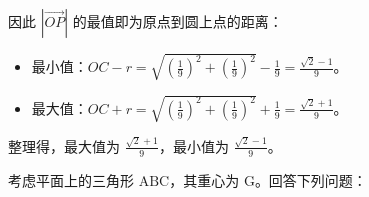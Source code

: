 \begin{questions}
\begin{parts}
\begin{solution}
        
        因此 $|\overrightarrow{OP}|$ 的最值即为原点到圆上点的距离：
        \begin{itemize}
            \item 最小值：$OC - r = \sqrt{(\frac{1}{9})^2 + (\frac{1}{9})^2} - \frac{1}{9} = \frac{\sqrt{2}-1}{9}$。
            \item 最大值：$OC + r = \sqrt{(\frac{1}{9})^2 + (\frac{1}{9})^2} + \frac{1}{9} = \frac{\sqrt{2}+1}{9}$。
        \end{itemize}
        整理得，最大值为 $\frac{\sqrt{2}+1}{9}$，最小值为 $\frac{\sqrt{2}-1}{9}$。
    \end{solution}
\end{parts}

\question
考虑平面上的三角形 $\mathrm{ABC}$，其重心为 $\mathrm{G}$。回答下列问题：

\end{questions}
